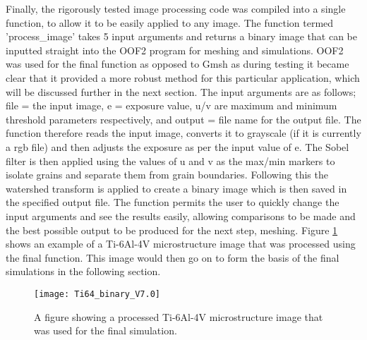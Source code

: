 \documentclass[\report.tex]{subfiles}
\begin{document}
\noindent Finally, the rigorously tested image processing code was compiled into a single function, to allow it to be easily applied to any image. The function termed 'process\_image' takes 5 input arguments and returns a binary image that can be inputted straight into the OOF2 program for meshing and simulations. OOF2 was used for the final function as opposed to Gmsh as during testing it became clear that it provided a more robust method for this particular application, which will be discussed further in the next section. The input arguments are as follows; file = the input image, e = exposure value, u/v are maximum and minimum threshold parameters respectively, and output = file name for the output file. The function therefore reads the input image, converts it to grayscale (if it is currently a rgb file) and then adjusts the exposure as per the input value of e. The Sobel filter is then applied using the values of u and v as the max/min markers to isolate grains and separate them from grain boundaries. Following this the watershed transform is applied to create a binary image which is then saved in the specified output file. The function permits the user to quickly change the input arguments and see the results easily, allowing comparisons to be made and the best possible output to be produced for the next step, meshing. Figure \ref{fig:FinalSim} shows an example of a Ti-6Al-4V microstructure image that was processed using the final function. This image would then go on to form the basis of the final simulations in the following section.

\begin{figure}[!htb]
  \centering
  \texttt{[image: Ti64\_binary\_V7.0]}
  \caption{A figure showing a processed Ti-6Al-4V microstructure image that was used for the final simulation.}
  \label{fig:FinalSim}
\end{figure}
\end{document}
